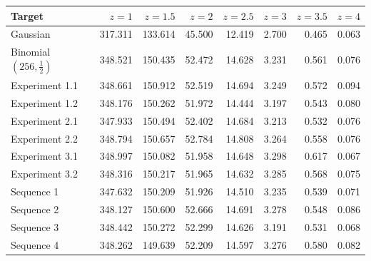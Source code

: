 \begin{tabular}{lrrrrrrr}
\hline
Target & $z=1$ & $z=1.5$ & $z=2$ & $z=2.5$ & $z=3$ & $z=3.5$ & $z=4$ \\
\hline
Gaussian & 317.311 & 133.614 & 45.500 & 12.419 & 2.700 & 0.465 & 0.063 \\
Binomial$(256,\tfrac12)$ & 348.521 & 150.435 & 52.472 & 14.628 & 3.231 & 0.561 & 0.076 \\
\hline
Experiment 1.1 & 348.661 & 150.912 & 52.519 & 14.694 & 3.249 & 0.572 & 0.094 \\
Experiment 1.2 & 348.176 & 150.262 & 51.972 & 14.444 & 3.197 & 0.543 & 0.080 \\
Experiment 2.1 & 347.933 & 150.494 & 52.402 & 14.684 & 3.213 & 0.532 & 0.076 \\
Experiment 2.2 & 348.794 & 150.657 & 52.784 & 14.808 & 3.264 & 0.558 & 0.076 \\
Experiment 3.1 & 348.997 & 150.082 & 51.958 & 14.648 & 3.298 & 0.617 & 0.067 \\
Experiment 3.2 & 348.316 & 150.217 & 51.965 & 14.632 & 3.285 & 0.568 & 0.075 \\
Sequence 1 & 347.632 & 150.209 & 51.926 & 14.510 & 3.235 & 0.539 & 0.071 \\
Sequence 2 & 348.127 & 150.600 & 52.666 & 14.691 & 3.278 & 0.548 & 0.086 \\
Sequence 3 & 348.442 & 150.272 & 52.299 & 14.626 & 3.191 & 0.531 & 0.068 \\
Sequence 4 & 348.262 & 149.639 & 52.209 & 14.597 & 3.276 & 0.580 & 0.082 \\
\hline
\end{tabular}
